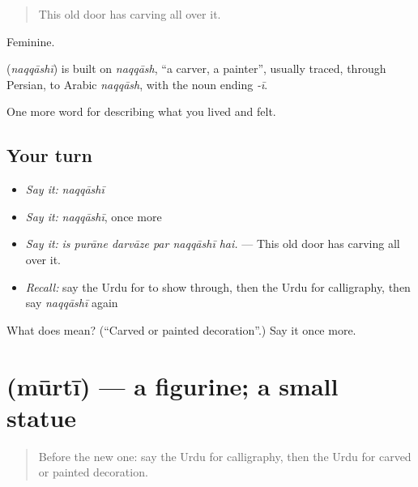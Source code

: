 \begin{quote}
This old door has carving all over it.
\end{quote}

Feminine.

\begin{cousinweb}
\textbf{} (\emph{naqqāshī}) is built on \emph{naqqāsh}, \textquotedblleft{}a carver, a painter\textquotedblright{}, usually traced, through Persian, to Arabic \emph{naqqāsh}, with the noun ending \emph{-ī}.
\end{cousinweb}

\begin{grammarlens}[title={What you've built}]
One more word for describing what you lived and felt.
\end{grammarlens}

\subsection*{Your turn}
\begin{itemize}
\raggedright
  \item \emph{Say it:} \emph{naqqāshī}
  \item \emph{Say it:} \emph{naqqāshī}, once more
  \item \emph{Say it:} \emph{is purāne darvāze par naqqāshī hai.} — This old door has carving all over it.
  \item \emph{Recall:} say the Urdu for to show through, then the Urdu for calligraphy, then say \emph{naqqāshī} again
\end{itemize}

\begin{tcolorbox}[breakable,colback=teal!4,colframe=teal!35!black,title={Before you move on}]
What does  mean? (\textquotedblleft{}Carved or painted decoration\textquotedblright{}.) Say it once more.
\end{tcolorbox}
\section[\texorpdfstring{\ur{مورتی} (mūrtī)}{مورتی (mūrtī)}]{ (mūrtī) — a figurine; a small statue}

\label{lesson:UR-C516-murti}



\begin{quote}
Before the new one: say the Urdu for calligraphy, then the Urdu for carved or painted decoration.
\end{quote}

